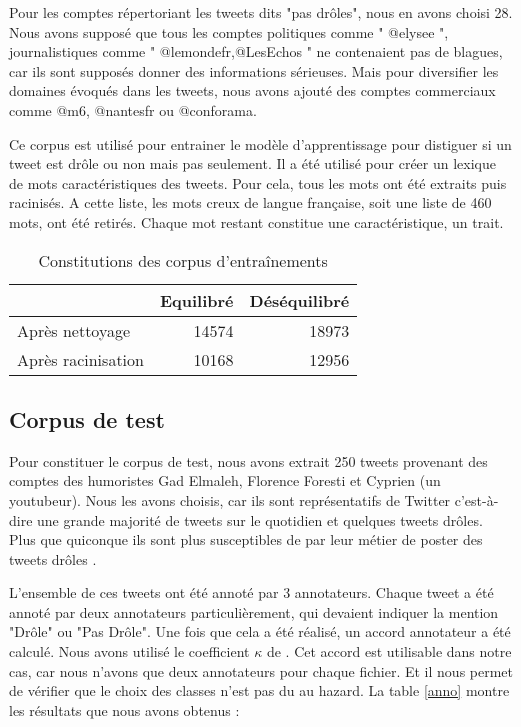 \documentclass[10pt,a4paper,twoside]{article}
\begin{document}
Pour les comptes répertoriant les tweets dits "pas drôles", nous en avons choisi 28. Nous avons supposé que tous les comptes politiques comme " @elysee ", journalistiques comme " @lemondefr,@LesEchos " ne contenaient pas de blagues, car ils sont supposés donner des informations sérieuses. Mais pour diversifier les domaines évoqués dans les tweets, nous avons ajouté des comptes commerciaux comme @m6, @nantesfr ou @conforama.

Ce corpus est utilisé pour entrainer le modèle d'apprentissage pour distiguer si un tweet est drôle ou non mais pas seulement. Il a été utilisé pour créer un lexique de mots caractéristiques des tweets. Pour cela, tous les mots ont été extraits puis racinisés. A cette liste, les mots creux de langue française, soit une liste de 460 mots, ont été retirés. Chaque mot restant constitue une caractéristique, un trait.



\begin{table}[!h]
\centering
	\begin{tabular}{lrr}
	\toprule
	& Equilibré & Déséquilibré \\
	\midrule
	 Après nettoyage & 14574 & 18973 \\
	 Après racinisation & 10168 & 12956 \\
	\bottomrule
	\end{tabular}
\caption{Constitutions des corpus d'entraînements}
\end{table}

\subsection{Corpus de test} 
Pour constituer le corpus de test, nous avons extrait 250 tweets provenant des comptes des humoristes Gad Elmaleh, Florence Foresti et Cyprien (un youtubeur). Nous les avons choisis, car ils sont représentatifs de Twitter c'est-à-dire une grande majorité de tweets sur le quotidien et quelques tweets drôles. Plus que quiconque ils sont plus susceptibles de par leur métier de poster des tweets drôles .

L'ensemble de ces tweets ont été annoté par 3 annotateurs. Chaque tweet a été annoté par deux annotateurs particulièrement, qui devaient indiquer la mention "Drôle" ou "Pas Drôle". Une fois que cela a été réalisé, un accord annotateur a été calculé. Nous avons utilisé le coefficient $\kappa$ de \cite{cohen1960}. Cet accord est utilisable dans notre cas, car nous n'avons que deux annotateurs pour chaque fichier. Et il nous permet de vérifier que le choix des classes n'est pas du au hazard. La table \ref{anno} montre les résultats que nous avons obtenus :
\end{document}
